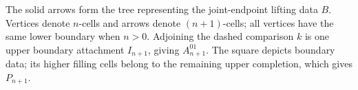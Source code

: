 \begin{fixedfigure}
\centering
{}
\caption{The solid arrows form the tree representing the joint-endpoint
lifting data \(B\).  Vertices denote \(n\)-cells and arrows denote
\((n+1)\)-cells; all vertices have the same lower boundary when \(n>0\).
Adjoining the dashed comparison \(k\) is one upper boundary attachment
\(I_{n+1}\), giving \(A_{n+1}^{01}\).  The square depicts boundary
data; its higher filling cells belong to the remaining upper completion,
which gives \(P_{n+1}\).}
\label{fig:joint-endpoints}
\end{fixedfigure}
